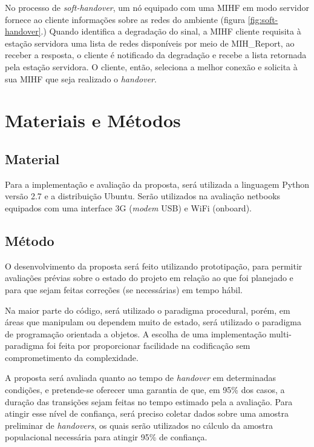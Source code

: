 \documentclass[12pt]{article}
\begin{document}
No processo de \textit{soft-handover}, um nó equipado com uma MIHF em modo 
servidor fornece ao cliente informações sobre as redes do ambiente (figura 
\ref{fig:soft-handover}.) Quando identifica a degradação do sinal, a MIHF 
cliente requisita à estação servidora uma lista de redes disponíveis por meio 
de MIH\_Report, ao receber a resposta, o cliente é notificado da degradação e 
recebe a lista retornada pela estação servidora. O cliente, então, seleciona a 
melhor conexão e solicita à sua MIHF que seja realizado o \textit{handover}.



\section{Materiais e Métodos} %

\subsection{Material}

Para a implementação e avaliação da proposta, será utilizada a linguagem 
Python versão 2.7 e a distribuição Ubuntu. Serão utilizados na avaliação 
netbooks equipados com uma interface 3G (\textit{modem} USB) e WiFi (onboard).

\subsection{Método}

O desenvolvimento da proposta será feito utilizando prototipação, para 
permitir avaliações prévias sobre o estado do projeto em relação ao que foi 
planejado e para que sejam feitas correções (se necessárias) em tempo hábil.

Na maior parte do código, será utilizado o paradigma procedural, porém, em 
áreas que manipulam ou dependem muito de estado, será utilizado o paradigma de 
programação orientada a objetos. A escolha de uma implementação 
multi-paradigma foi feita por proporcionar facilidade na codificação sem 
comprometimento da complexidade.

A proposta será avaliada quanto ao tempo de \textit{handover} em determinadas 
condições, e pretende-se oferecer uma garantia de que, em 95\% dos casos, a
duração das transições sejam feitas no tempo estimado pela a avaliação. Para 
atingir esse nível de confiança, será preciso coletar dados sobre uma amostra 
preliminar de \textit{handovers}, os quais serão utilizados no cálculo da 
amostra populacional necessária para atingir 95\% de confiança.
\end{document}
